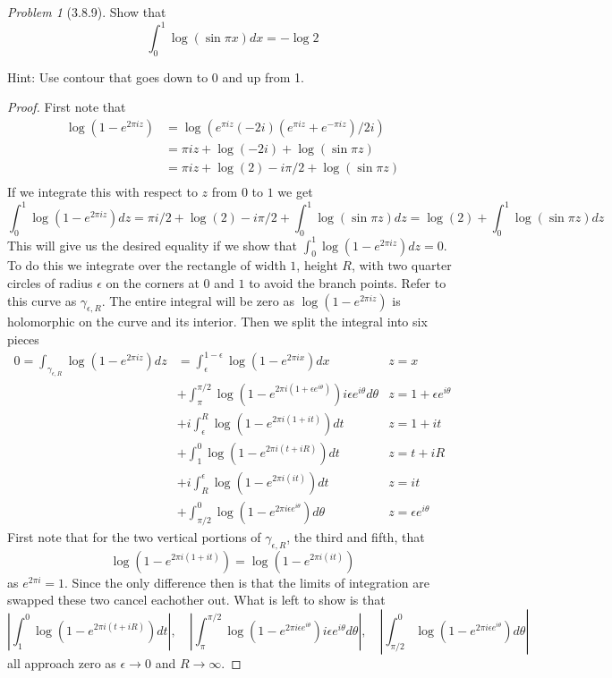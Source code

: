 \documentclass[10pt]{article}
\newcommand{\sk}{\vskip 10mm}
\theoremstyle{remark}
\newtheorem{problem}{Problem}
\theoremstyle{remark}
\begin{document}
\sk

\begin{problem}[3.8.9]
  Show that
  \[
    \int_0^1\log(\sin\pi x)dx = -\log 2
  \]

  Hint: Use contour that goes down to 0 and up from 1.
\end{problem}

\begin{proof}
  First note that
  \begin{align*}
    \log(1-e^{2\pi iz}) &=\log(e^{\pi iz}(-2i)(e^{\pi iz}+e^{-\pi iz})/2i)\\
                      &=\pi iz + \log(-2i)+\log(\sin\pi z)\\
                      &= \pi iz + \log(2)-i\pi/2+\log(\sin\pi z)\\
  \end{align*}
  If we integrate this with respect to $z$ from $0$ to $1$ we get
  \[
    \int_0^1\log(1-e^{2\pi iz})dz=\pi i/2+\log(2)-i\pi/2+\int_0^1\log(\sin\pi z) dz = \log(2)+\int_0^1\log(\sin\pi z) dz
  \]
  This will give us the desired equality if we show that $\int_0^1\log(1-e^{2\pi iz})dz=0$. To do this
  we integrate over the rectangle of width $1$, height $R$, with two quarter circles of radius $\epsilon$
  on the corners at $0$ and $1$ to avoid the branch points. Refer to this curve as $\gamma_{\epsilon,R}$. The
  entire integral will be zero as $\log(1-e^{2\pi iz})$ is holomorphic on the curve and its interior.
  Then we split the integral into six pieces
  \begin{align*}
    0 = \int_{\gamma_{\epsilon,R}}\log(1-e^{2\pi iz})dz &= \int_\epsilon^{1-\epsilon}\log(1-e^{2\pi ix}) dx & z=x\\
                                                     &+ \int_{\pi}^{\pi/2}\log(1-e^{2\pi i(1+\epsilon e^{i\theta})})i\epsilon e^{i\theta}d\theta & z=1+\epsilon e^{i\theta}\\
                                                     &+ i\int_\epsilon^R\log(1-e^{2\pi i(1+it)})dt & z=1+it\\
                                                     &+ \int_1^0\log(1-e^{2\pi i(t+iR)})dt & z=t+iR\\
                                                     &+ i\int_R^\epsilon\log(1-e^{2\pi i(it)}) dt & z=it\\
                                                     &+ \int_{\pi/2}^0\log(1-e^{2\pi i \epsilon e^{i\theta}}) d\theta & z=\epsilon e^{i\theta}
  \end{align*}
  First note that for the two vertical portions of $\gamma_{\epsilon,R}$, the third and fifth, that
  \[
    \log(1-e^{2\pi i(1+it)}) = \log(1-e^{2\pi i(it)})
  \]
  as $e^{2\pi i }=1$. Since the only difference then is that the limits of integration are swapped
  these two cancel eachother out. What is left to show is that
  \[
    \left|\int_1^0\log(1-e^{2\pi i(t+iR)})dt\right|,\quad\left|\int_{\pi}^{\pi/2}\log(1-e^{2\pi i\epsilon e^{i\theta}})i\epsilon e^{i\theta}d\theta\right|,\quad \left|\int_{\pi/2}^0\log(1-e^{2\pi i \epsilon e^{i\theta}}) d\theta\right|
  \]
  all approach zero as $\epsilon\rightarrow 0 $ and $R\rightarrow\infty$.


\end{proof}
\end{document}
